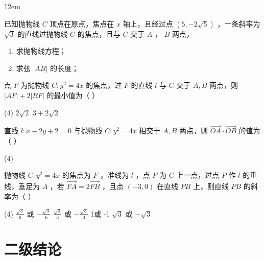 \v{12em}

\begin{example}
    已知抛物线 $C$ 顶点在原点，焦点在 $x$ 轴上，且经过点 $(5,-2 \sqrt{5})$ ，一条斜率为 $\sqrt{3}$ 的直线过抛物线 $C$ 的焦点，且与 $C$ 交于 $A$ ， $B$ 两点，
    \begin{enumerate}
        \item 求抛物线方程；
        \item 求弦 $|A B|$ 的长度；
    \end{enumerate}
\end{example}

\vspace{10em}

\begin{example}
    点 $F$ 为抛物线 $C: y^2=4 x$ 的焦点，过 $F$ 的直线 $l$ 与 $C$ 交于 $A, B$ 两点，则 $|A F|+2|B F|$ 的最小值为（ \hspace{2em}）
    \begin{tasks}(4)
        \task $2 \sqrt{2}$
        \task $3+2 \sqrt{2}$
    \end{tasks}
\end{example}

\vspace{10em}

\begin{example}
    直线 $l: x-2 y+2=0$ 与抛物线 $C: y^2=4 x$ 相交于 $A, B$ 两点，则 $\overrightarrow{O A} \cdot \overrightarrow{O B}$ 的值为（\hspace{2em} ）
    \begin{tasks}(4)
    \end{tasks}
\end{example}

\begin{example}
    抛物线 $C: y^2=4 x$ 的焦点为 $F$ ，准线为 $l$ ，点 $P$ 为 $C$ 上一点，过点 $P$ 作 $l$ 的垂线，垂足为 $A$ ，若 $\overrightarrow{F A}=2 \overrightarrow{F B}$ ，且点 $(-3,0)$ 在直线 $P B$ 上，则直线 $P B$ 的斜率为（ \hspace{2em}）
    \begin{tasks}(4)
        \task $\frac{\sqrt{3}}{6}$ 或 $-\frac{\sqrt{3}}{6}$
        \task $\frac{\sqrt{3}}{3}$ 或 $-\frac{\sqrt{3}}{3}$
        \task 1或 -1
        \task $\sqrt{3}$ 或 $-\sqrt{3}$
    \end{tasks}
\end{example}

\section{二级结论}

